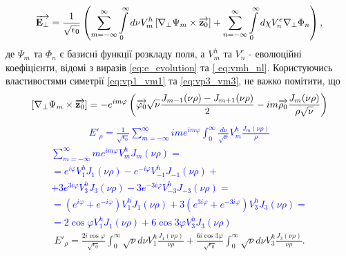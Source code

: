 \begin{equation} \begin{aligned}
\overrightarrow{\mathbf E_\perp} = \frac{1}{\sqrt{\epsilon_0}} \left( 
\sum \limits_{m=-\infty}^{\infty} \int \limits_{0}^{\infty} 
d \nu V_m^h \left[  \nabla_\perp \Psi_m  \times  \overrightarrow{\mathbf z_0}  \right] +
\sum \limits_{n=-\infty}^{\infty} \int \limits_{0}^{\infty}
d \chi V_n^e \nabla_\perp \Phi_n \right),
\end{aligned} \end{equation}
%
де $ \Psi_m $ та $ \Phi_n  $ є базисні функції розкладу поля, а $ V_m^h $
та $ V_n^e $ - еволюційні коефіцієнти, відомі з виразів \eqref{eq:e_evolution}
та \eqref{ eq:vmh_nl}. Користуючись властивостями симетрії 
\eqref{eq:vp1_vm1} та \eqref{eq:vp3_vm3}, не важко помітити, що
%
\textcolor{blue} { \begin{equation*} \begin{aligned}
\left[  \nabla_\perp \Psi_m  \times  \overrightarrow{\mathbf z_0}  \right] = 
- e^{im\varphi} \left( \overrightarrow{\mathbf \varphi_0} \sqrt{\nu} 
\frac{J_{m-1} (\nu \rho) - J_{m+1} (\nu \rho)}{2} - 
i m \overrightarrow{\mathbf \rho_0} \frac{J_m (\nu \rho)}{ \rho \sqrt{\nu}} \right)
\end{aligned} \end{equation*} }
%
\textcolor{blue} { \begin{equation*} \begin{aligned}
E'_\rho = \frac{1}{\sqrt{\epsilon_0}} \sum_{m=-\infty}^{\infty} 
i m e^{im\varphi} \int_{0}^{\infty} \frac{d \nu}{\sqrt{\nu}} 
V_m^h \frac{J_m(\nu \rho)}{\rho}
\end{aligned} \end{equation*} }
%
\textcolor{blue} { \begin{equation*} \begin{aligned}
\sum_{m=-\infty}^\infty m e^{im \varphi} V_m^h J_m(\nu \rho) = \\ =
  e^{  i \varphi} V_{ 1}^h J_{ 1}(\nu \rho) - 
  e^{- i \varphi} V_{-1}^h J_{-1}(\nu \rho) + \\ +
3 e^{ 3i \varphi} V_{ 3}^h J_{ 3}(\nu \rho) - 
3 e^{-3i \varphi} V_{-3}^h J_{-3}(\nu \rho) = \\ =
\left( e^{ i\varphi} + e^{- i\varphi} \right) V_1^h J_1(\nu \rho) + 
3 \left( e^{3i\varphi} + e^{-3i\varphi} \right) V_3^h J_3(\nu \rho) = \\
= 2 \cos \varphi V_1^h J_1(\nu \rho) + 
6 \cos 3 \varphi V_3^h J_3(\nu \rho)
\end{aligned} \end{equation*} }
%
\begin{equation} \begin{aligned}
E'_\rho = \frac{2 i \cos \varphi}{\sqrt{\epsilon_0}}
\int_0^\infty \sqrt{\nu} d \nu V_1^h \frac{J_1(\nu \rho)}{\nu \rho} +
\frac{6 i \cos 3 \varphi}{\sqrt{\epsilon_0}}
\int_0^\infty \sqrt{\nu} d \nu V_3^h \frac{J_3(\nu \rho)}{\nu \rho}.
\end{aligned} \end{equation}


